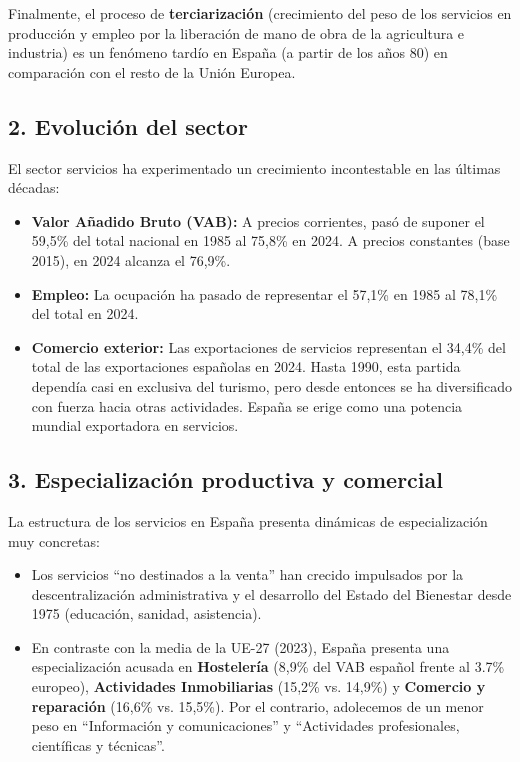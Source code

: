Finalmente, el proceso de \textbf{terciarización} (crecimiento del peso de los servicios en producción y empleo por la liberación de mano de obra de la agricultura e industria) es un fenómeno tardío en España (a partir de los años 80) en comparación con el resto de la Unión Europea.

\subsection*{2. Evolución del sector}

El sector servicios ha experimentado un crecimiento incontestable en las últimas décadas:

\begin{itemize}
  \item \textbf{Valor Añadido Bruto (VAB):} A precios corrientes, pasó de suponer el 59,5\% del total nacional en 1985 al 75,8\% en 2024. A precios constantes (base 2015), en 2024 alcanza el 76,9\%.
  \item \textbf{Empleo:} La ocupación ha pasado de representar el 57,1\% en 1985 al 78,1\% del total en 2024.
  \item \textbf{Comercio exterior:} Las exportaciones de servicios representan el 34,4\% del total de las exportaciones españolas en 2024. Hasta 1990, esta partida dependía casi en exclusiva del turismo, pero desde entonces se ha diversificado con fuerza hacia otras actividades. España se erige como una potencia mundial exportadora en servicios.
\end{itemize}

\subsection*{3. Especialización productiva y comercial}

La estructura de los servicios en España presenta dinámicas de especialización muy concretas:

\begin{itemize}
  \item Los servicios ``no destinados a la venta'' han crecido impulsados por la descentralización administrativa y el desarrollo del Estado del Bienestar desde 1975 (educación, sanidad, asistencia).
  \item En contraste con la media de la UE-27 (2023), España presenta una especialización acusada en \textbf{Hostelería} (8,9\% del VAB español frente al 3.7\% europeo), \textbf{Actividades Inmobiliarias} (15,2\% vs. 14,9\%) y \textbf{Comercio y reparación} (16,6\% vs. 15,5\%). Por el contrario, adolecemos de un menor peso en ``Información y comunicaciones'' y ``Actividades profesionales, científicas y técnicas''.
\end{itemize}

